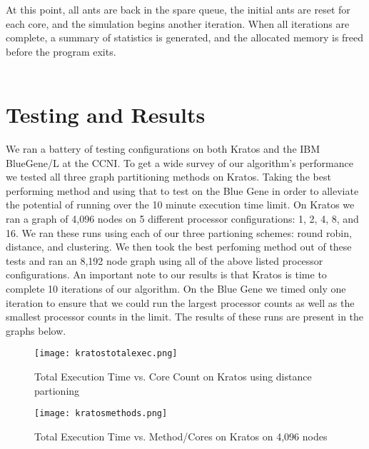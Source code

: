 \documentclass{acm_proc_article-sp}
\begin{document}
At this point, all ants are back in the spare queue, the initial ants are reset
for each core, and the simulation begins another iteration. When all iterations
are complete, a summary of statistics is generated, and the allocated memory is
freed before the program exits. \\ \\

\section{Testing and Results}
We ran a battery of testing configurations on both Kratos and the IBM BlueGene/L at the CCNI. To get a wide survey of our algorithm's performance we tested all three graph partitioning methods on Kratos. Taking the best
performing method and using that to test on the Blue Gene in order to alleviate the potential of running over the 10 minute execution time limit. On Kratos we ran a graph of 4,096 nodes on 5 different 
processor configurations: 1, 2, 4, 8, and 16. We ran these runs using each of our three partioning schemes: round robin, distance, and clustering. We then took the best perfoming method out of these tests
and ran an 8,192 node graph using all of the above listed processor configurations. An important note to our results is that Kratos is time to complete 10 iterations of our algorithm. On the Blue Gene we timed only one iteration to ensure that we could run the largest processor counts as well as the smallest processor counts in the limit. The results of these runs are present in the graphs below.

\begin{figure}[h!]
    \texttt{[image: kratostotalexec.png]}
    \caption{Total Execution Time vs. Core Count on Kratos using distance partioning}
\end{figure}

\begin{figure}[h!]
    \texttt{[image: kratosmethods.png]}
    \caption{Total Execution Time vs. Method/Cores on Kratos on 4,096 nodes}
\end{figure}
\end{document}
